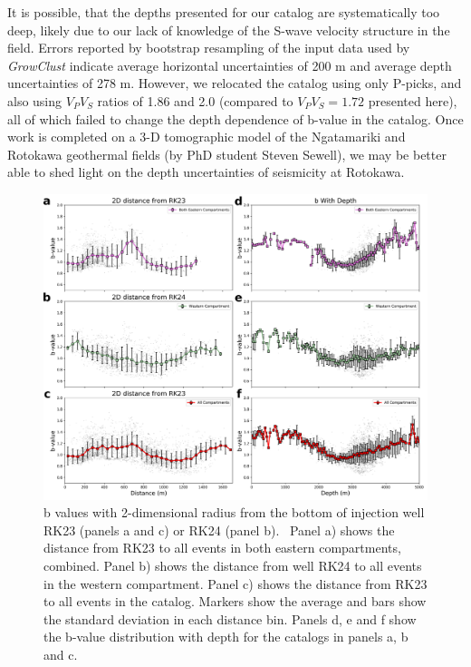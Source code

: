It is possible, that the depths presented for our catalog are systematically too deep, likely due to our lack of knowledge of the S-wave velocity structure in the field. Errors reported by bootstrap resampling of the input data used by \textit{GrowClust} indicate average horizontal uncertainties of 200 m and average depth uncertainties of 278 m. However, we relocated the catalog using only P-picks, and also using $V_{P}V_{S}$ ratios of 1.86 and 2.0 (compared to $V_{P}V_{S}=1.72$ presented here), all of which failed to change the depth dependence of b-value in the catalog. Once work is completed on a 3-D tomographic model of the Ngatamariki and Rotokawa geothermal fields (by PhD student Steven Sewell), we may be better able to shed light on the depth uncertainties of seismicity at Rotokawa.
\begin{figure}[h!]
\begin{center}
\includegraphics[width=0.98\columnwidth]{Chapter_4_Rot/figures/Rot_bval_w_radius_2D_RK23_min100_max300/Rot_bvalues_2D-depth_plots_2-17_labels_original}
\caption{{b values with 2-dimensional radius from the bottom of injection well
RK23 (panels a and c) or RK24 (panel b).~ Panel a) shows the distance
from RK23 to all events in both eastern compartments, combined. Panel b)
shows the distance from well RK24 to all events in the western
compartment. Panel c) shows the distance from RK23 to all events in the
catalog. Markers show the average and bars show the standard deviation
in each distance bin. Panels d, e and f show the b-value distribution
with depth for the catalogs in panels a, b and c.
{\label{922043}}%
}}
\end{center}
\end{figure}

